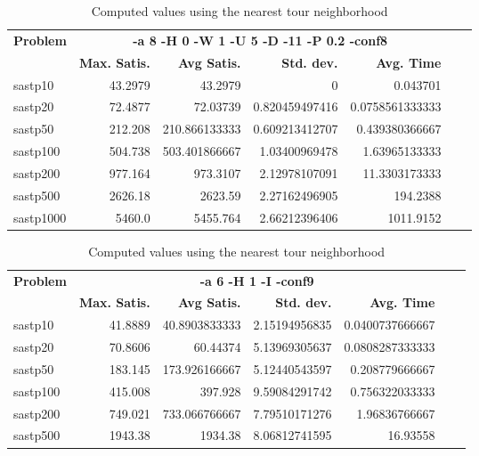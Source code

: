 \documentclass{article}
\begin{document}
\begin{table}[b!]
  \vspace{-6mm}%
  \caption{Computed values using the nearest tour neighborhood}
  \label{tab:NearestTour}
  \setlength{\tabcolsep}{1.4mm}
  \centering
  \begin{tabular}{lrrrrrr}
   \multirow{2}{*}{\bfseries Problem} &
      \multicolumn{4}{c}{\bfseries -a 8 -H 0 -W 1 -U 5 -D -11 -P 0.2 -conf8 } \\
    &
    \bfseries Max. Satis. &
    \bfseries Avg Satis. &
    \bfseries Std. dev. &
    \bfseries Avg. Time 
    \\\hline
   sastp10 & 43.2979 & 43.2979 & 0& 0.043701 \\ 
sastp20 & 72.4877 & 72.03739 & 0.820459497416 & 0.0758561333333 \\ 
sastp50 & 212.208 & 210.866133333 & 0.609213412707 & 0.439380366667 \\ 
sastp100 & 504.738 & 503.401866667 & 1.03400969478 & 1.63965133333 \\ 
sastp200 & 977.164 & 973.3107 & 2.12978107091 & 11.3303173333 \\ 
sastp500 & 2626.18 & 2623.59 & 2.27162496905 & 194.2388 \\ 
sastp1000 & 5460.0 & 5455.764 & 2.66212396406 & 1011.9152

    \\\hline
  \end{tabular}

\end{table}

\begin{table}[b!]
  \vspace{-6mm}%
  \caption{Computed values using the nearest tour neighborhood}
  \label{tab:NearestTour}
  \setlength{\tabcolsep}{1.4mm}
  \centering
  \begin{tabular}{lrrrrrr}
   \multirow{2}{*}{\bfseries Problem} &
      \multicolumn{4}{c}{\bfseries -a 6 -H 1 -I -conf9 } \\
    &
    \bfseries Max. Satis. &
    \bfseries Avg Satis. &
    \bfseries Std. dev. &
    \bfseries Avg. Time 
    \\\hline
    sastp10 & 41.8889 & 40.8903833333 & 2.15194956835 & 0.0400737666667 \\ 
sastp20 & 70.8606 & 60.44374 & 5.13969305637 & 0.0808287333333 \\ 
sastp50 & 183.145 & 173.926166667 & 5.12440543597 & 0.208779666667 \\ 
sastp100 & 415.008 & 397.928 & 9.59084291742 & 0.756322033333 \\ 
sastp200 & 749.021 & 733.066766667 & 7.79510171276 & 1.96836766667 \\ 
sastp500 & 1943.38 & 1934.38 & 8.06812741595 & 16.93558

    \\\hline
  \end{tabular}

\end{table}
\end{document}
